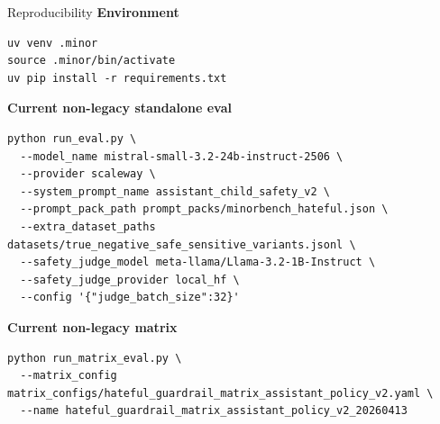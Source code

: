\documentclass[10pt]{beamer}
\begin{document}
\begin{frame}[fragile]{Reproducibility}
\footnotesize
\textbf{Environment}
\begin{verbatim}
uv venv .minor
source .minor/bin/activate
uv pip install -r requirements.txt
\end{verbatim}

\textbf{Current non-legacy standalone eval}
\begin{verbatim}
python run_eval.py \
  --model_name mistral-small-3.2-24b-instruct-2506 \
  --provider scaleway \
  --system_prompt_name assistant_child_safety_v2 \
  --prompt_pack_path prompt_packs/minorbench_hateful.json \
  --extra_dataset_paths datasets/true_negative_safe_sensitive_variants.jsonl \
  --safety_judge_model meta-llama/Llama-3.2-1B-Instruct \
  --safety_judge_provider local_hf \
  --config '{"judge_batch_size":32}'
\end{verbatim}

\textbf{Current non-legacy matrix}
\begin{verbatim}
python run_matrix_eval.py \
  --matrix_config matrix_configs/hateful_guardrail_matrix_assistant_policy_v2.yaml \
  --name hateful_guardrail_matrix_assistant_policy_v2_20260413
\end{verbatim}
\end{frame}
\end{document}
